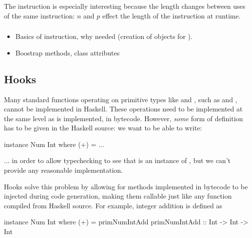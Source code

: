\documentclass[dissertation.tex]{subfiles}
\begin{document}
{{{            The  instruction is especially interesting because the length changes between
            uses of the same instruction: \(n\) and \(p\) effect the length of the instruction at runtime.
        
        }
        \subsubsection{}
        {

            \begin{itemize}
            \item
            {
                Basics of instruction, why needed (creation of  objects for
                ).
            }
            \item Boostrap methods, class attributes
            \end{itemize}
        }
    }
    \subsection{Hooks}\label{sec:hooks}
    {

        Many standard functions operating on primitive types like  and , such as
        \haskell{(+)} and \haskell{(==)}, cannot be implemented in Haskell. These operations need to be implemented
        at the same level as  is implemented, in bytecode. However, \textit{some} form of definition
        has to be given in the Haskell source: we want to be able to write:

        \begin{haskellfigure}
        instance Num Int where
            (+) = ...
        \end{haskellfigure}

        ... in order to allow typechecking to see that  is an instance of , but we can't
        provide any reasonable implementation.

        Hooks solve this problem by allowing for methods implemented in bytecode to be injected during code
        generation, making them callable just like any function compiled from Haskell source. For example, integer
        addition is defined as 

        \begin{haskellfigure}
        instance Num Int where
            (+) = primNumIntAdd
        primNumIntAdd :: Int -> Int -> Int
        \end{haskellfigure}

}}
\end{document}
